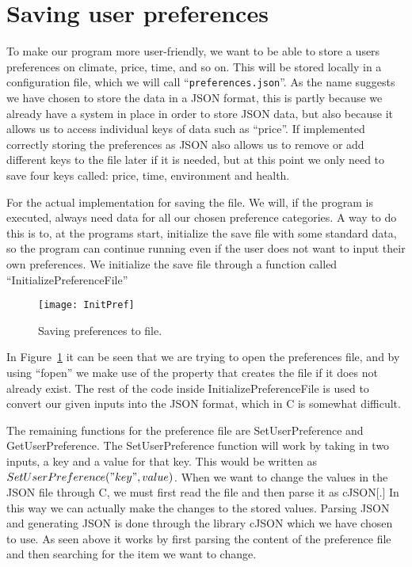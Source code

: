 \section{Saving user preferences}\label{sec:saving-user-preferences}

To make our program more user-friendly, we want to be able to store a users preferences on climate, price,
time, and so on.
This will be stored locally in a configuration file, which we will call
``\verb|preferences.json|''.
As the name suggests we have chosen to store the data in a JSON format, this is partly because we already have
a system in place in order to store JSON data, but also because it allows us to access individual keys of data such as
``price''.
If implemented correctly storing the preferences as JSON also allows us to remove or add different keys to the file
later if it is needed, but at this point we only need to save four keys called: price, time, environment and health.

For the actual implementation for saving the file.
We will, if the program is executed, always need data for all our chosen preference categories.
A way to do this is to, at the programs start, initialize the save file with some standard data, so the program can
continue running even if the user does not want to input their own preferences.
We initialize the save file through a function called ``InitializePreferenceFile''

\begin{figure}
    \centering
    \texttt{[image: InitPref]}
    \caption{Saving preferences to file.}
    \label{fig:figureInitSaveFile}
\end{figure}

In Figure~\ref{fig:figureInitSaveFile} it can be seen that we are trying to open the preferences file,
and by using ``fopen'' we make use of the property that creates the file if it does not already exist.
The rest of the code inside InitializePreferenceFile is used to convert our given inputs into the JSON format, which in
C is somewhat difficult.

The remaining functions for the preference file are SetUserPreference and GetUserPreference.
The SetUserPreference function will work by taking in two inputs, a key and a value for that key.
This would be written as \(SetUserPreference("key", value)\).
When we want to change the values in the JSON file through C, we must first read the file and then parse it as cJSON[.]
In this way we can actually make the changes to the stored values.
Parsing JSON and generating JSON is done through the library cJSON which we have chosen to use.
As seen above it works by first parsing the content of the preference file and then searching for the item we want to
change.

